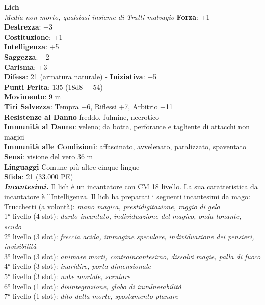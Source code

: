 \begin{multicols}{2}
\medskip\textbf{Lich}\\
\emph{Media non morto, qualsiasi insieme di Tratti malvagio}
\textbf{Forza}: +1\\
\textbf{Destrezza}: +3\\
\textbf{Costituzione}: +1\\
\textbf{Intelligenza}: +5\\
\textbf{Saggezza}: +2\\
\textbf{Carisma}: +3\\
\textbf{Difesa}: 21 (armatura naturale) - \textbf{Iniziativa}: +5\\
\textbf{Punti Ferita}: 135 (18d8 + 54)\\
\textbf{Movimento}: 9 m\\
\textbf{Tiri Salvezza}: Tempra +6, Riflessi +7, Arbitrio +11\\
\textbf{Resistenze al Danno} freddo, fulmine, necrotico\\
\textbf{Immunità al Danno}: veleno; da botta, perforante e tagliente di attacchi non magici\\
\textbf{Immunità alle Condizioni}: affascinato, avvelenato, paralizzato, spaventato\\
\textbf{Sensi}: visione del vero 36 m\\
\textbf{Linguaggi} Comune più altre cinque lingue\\
\textbf{Sfida}: 21 (33.000 PE)\smallskip\\
\emph{\textbf{Incantesimi.}} Il lich è un incantatore con CM 18 livello. La sua caratteristica da incantatore è l'Intelligenza. Il lich ha preparati i seguenti incantesimi da mago:\\
Trucchetti (a volontà): \emph{mano magica, prestidigitazione, raggio} \emph{di gelo}\\
1° livello (4 slot): \emph{dardo incantato, individuazione del magico,} \emph{onda tonante, scudo}\\
2° livello (3 slot): \emph{freccia acida, immagine speculare,} \emph{individuazione dei pensieri, invisibilità}\\
3° livello (3 slot): \emph{animare morti, controincantesimo, dissolvi} \emph{magie, palla di fuoco}\\
4° livello (3 slot): \emph{inaridire, porta dimensionale}\\
5° livello (3 slot): \emph{nube mortale, scrutare}\\
6° livello (1 slot): \emph{disintegrazione, globo di invulnerabilità}\\
7° livello (1 slot): \emph{dito della morte, spostamento planare}\\

\end{multicols}
